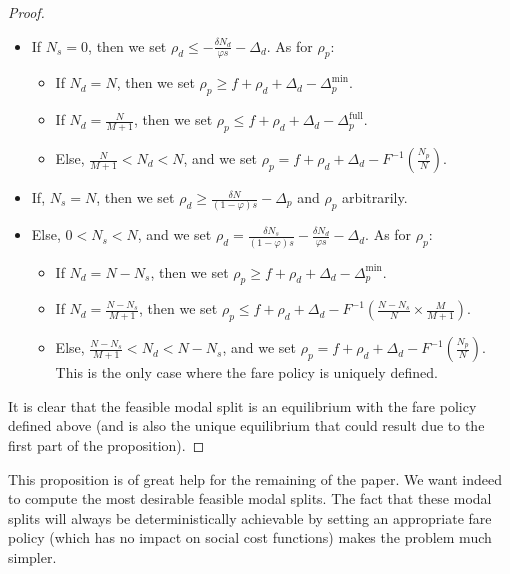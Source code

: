 \documentclass[english, a4paper]{article}
\theoremstyle{plain}
\theoremstyle{definition}
\theoremstyle{remark}
\begin{document}
\begin{proof}
    \begin{itemize}
        \item If $N_s = 0$, then we set $\rho _d \leq -\frac{\delta N_d}{\varphi s} - \Delta _d$. As for $\rho _p$:
        \begin{itemize}
            \item If $N_d = N$, then we set $\rho _p \geq f + \rho _d + \Delta _d - \Delta _p^{\text{min}}$.
            \item If $N_d = \frac{N}{M+1}$, then we set $\rho _p \leq f + \rho _d + \Delta _d - \Delta _p^{\text{full}}$.
            \item Else, $\frac{N}{M+1} < N_d < N$, and we set $\rho _p = f + \rho _d + \Delta _d - F^{-1}\left(\frac{N _p}{N} \right)$.
        \end{itemize}
        \item If, $N_s = N$, then we set $\rho _d \geq \frac{\delta N}{(1-\varphi)s} - \Delta _p$ and $\rho _p$ arbitrarily.
        \item Else, $0 < N_s < N$, and we set $\rho _d = \frac{\delta N_s}{(1-\varphi)s} - \frac{\delta N_d}{\varphi s} - \Delta _d$. As for $\rho _p$:
        \begin{itemize}
            \item If $N_d = N - N_s$, then we set $\rho _p \geq f + \rho_d + \Delta _d - \Delta _p ^{\text{min}}$.
            \item If $N_d = \frac{N - N_s}{M+1}$, then we set $\rho _p \leq f + \rho _d + \Delta _d - F^{-1}\left( \frac{N - N_s}{N} \times \frac{M}{M+1} \right)$.
            \item Else, $\frac{N - N_s}{M+1} < N_d < N - N_s$, and we set $\rho _p = f + \rho _d + \Delta _d - F^{-1}\left(\frac{N _p}{N} \right)$. This is the only case where the fare policy is uniquely defined.
        \end{itemize}
    \end{itemize}

    It is clear that the feasible modal split is an equilibrium with the fare policy defined above (and is also the unique equilibrium that could result due to the first part of the proposition).
    

\end{proof}

This proposition is of great help for the remaining of the paper. We want indeed to compute the most desirable feasible modal splits. The fact that these modal splits will always be deterministically achievable by setting an appropriate fare policy (which has no impact on social cost functions) makes the problem much simpler.
\end{document}
